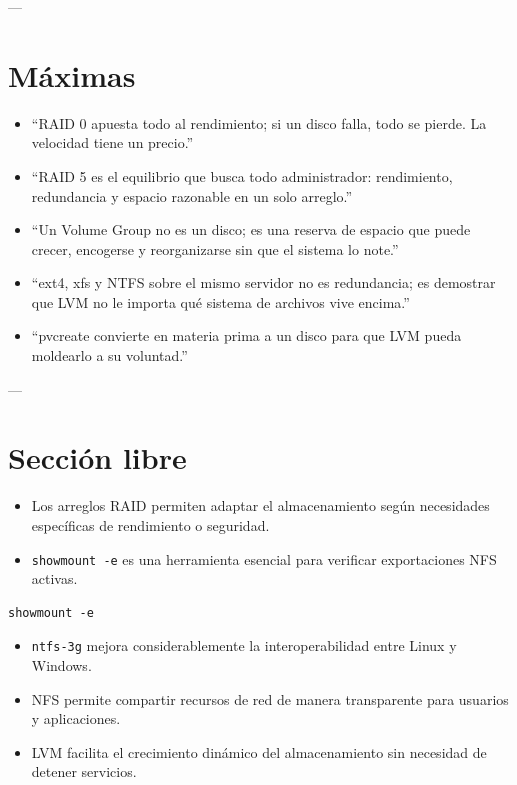 \documentclass[11pt, letterpaper]{article}
\begin{document}
---
\section{Máximas}
\label{sec:org1b850b4}

\begin{itemize}
\item “RAID 0 apuesta todo al rendimiento; si un disco falla, todo se pierde. La velocidad tiene un precio.”

\item “RAID 5 es el equilibrio que busca todo administrador: rendimiento, redundancia y espacio razonable en un solo arreglo.”

\item “Un Volume Group no es un disco; es una reserva de espacio que puede crecer, encogerse y reorganizarse sin que el sistema lo note.”

\item “ext4, xfs y NTFS sobre el mismo servidor no es redundancia; es demostrar que LVM no le importa qué sistema de archivos vive encima.”
\item “pvcreate convierte en materia prima a un disco para que LVM pueda moldearlo a su voluntad.”
\end{itemize}

---
\section{Sección libre}
\label{sec:orgace2eff}

\begin{itemize}
\item Los arreglos RAID permiten adaptar el almacenamiento según necesidades específicas de rendimiento o seguridad.

\item \texttt{showmount -e} es una herramienta esencial para verificar exportaciones NFS activas.
\end{itemize}

\begin{verbatim}
showmount -e
\end{verbatim}

\begin{itemize}
\item \texttt{ntfs-3g} mejora considerablemente la interoperabilidad entre Linux y Windows.
\item NFS permite compartir recursos de red de manera transparente para usuarios y aplicaciones.

\item LVM facilita el crecimiento dinámico del almacenamiento sin necesidad de detener servicios.
\end{itemize}
\end{document}
